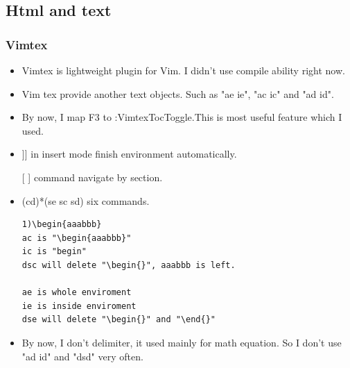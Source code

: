 \documentclass[a4paper,12pt,twoside]{book}
\begin{document}
\subsection{Html and text}

\subsubsection{Vimtex}
\begin{itemize}
		\item Vimtex is lightweight plugin for Vim. I didn't use compile ability right now. 
				
		\item Vim tex provide another text objects. Such as "ae ie", "ac ic" and "ad id". 
				
		\item By now, I map F3 to :VimtexTocToggle.This is most useful feature which I used. 
				
		\item ]] in insert mode finish environment automatically.
				
		\item [[ ]] command navigate by section.
				
		\item (cd)*(se sc sd) six commands. 
\begin{verbatim}
1)\begin{aaabbb}
ac is "\begin{aaabbb}"
ic is "begin"
dsc will delete "\begin{}", aaabbb is left.

ae is whole enviroment
ie is inside enviroment
dse will delete "\begin{}" and "\end{}" 
\end{verbatim}
	\item By now, I don't delimiter, it used mainly for math equation. So I don't use "ad id" and "dsd" very often. 
\end{itemize}
\end{document}
